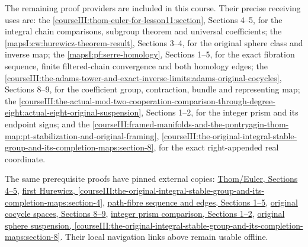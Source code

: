 The remaining proof providers are included in this course. Their precise receiving uses are: the \cref{courseIII:thom-euler-for-lesson11:section}, Sections 4--5, for the integral chain comparisons, subgroup theorem and universal coefficients; the \cref{mapsI:cw:hurewicz-theorem-result}, Sections 3--4, for the original sphere class and inverse map; the \cref{mapsI:pf:serre-homology}, Sections 1--5, for the exact fibration sequence, finite filtered-chain convergence and both homology edges; the \cref{courseIII:the-adams-tower-and-exact-inverse-limits:adams-original-cocycles}, Sections 8--9, for the coefficient group, contraction, bundle and representing map; the \cref{courseIII:the-actual-mod-two-cooperation-comparison-through-degree-eight:actual-eight-original-suspension}, Sections 1--2, for the integer prism and its endpoint signs; and the \cref{courseIII:framed-manifolds-and-the-pontryagin-thom-map:pt-stabilization-and-original-framing}, \cref{courseIII:the-original-integral-stable-group-and-its-completion-maps:section-8}, for the exact right-appended real coordinate.

The same prerequisite proofs have pinned external copies: \href{https://github.com/KokunoYumeto/open-math-courses/blob/72ad56efaa6388f333c9b477ff86a2b5c5b2e326/docs/courses/CG-S6/src/thom-euler-for-lesson11.md}{Thom/Euler, Sections 4--5}, \href{https://github.com/KokunoYumeto/open-math-courses/blob/72ad56efaa6388f333c9b477ff86a2b5c5b2e326/docs/courses/CG-S6/src/cw-models-and-the-first-hurewicz-map.md\#hurewicz-theorem}{first Hurewicz, \cref{courseIII:the-original-integral-stable-group-and-its-completion-maps:section-4}}, \href{https://github.com/KokunoYumeto/open-math-courses/blob/72ad56efaa6388f333c9b477ff86a2b5c5b2e326/docs/courses/CG-S6/src/path-fibres-and-integral-homotopy-equivalences.md\#serre-homology}{path-fibre sequence and edges, Sections 1--5}, \href{https://github.com/KokunoYumeto/open-math-courses/blob/72ad56efaa6388f333c9b477ff86a2b5c5b2e326/docs/courses/CG-S6/src/the-adams-tower-and-exact-inverse-limits.md\#adams-original-cocycles}{original cocycle spaces, Sections 8--9}, \href{https://github.com/KokunoYumeto/open-math-courses/blob/72ad56efaa6388f333c9b477ff86a2b5c5b2e326/docs/courses/CG-S6/src/the-actual-mod-two-cooperation-comparison-through-degree-eight.md\#actual-eight-original-suspension}{integer prism comparison, Sections 1--2}, \href{https://github.com/KokunoYumeto/open-math-courses/blob/72ad56efaa6388f333c9b477ff86a2b5c5b2e326/docs/courses/CG-S6/src/framed-manifolds-and-the-pontryagin-thom-map.md\#pt-stabilization-and-original-framing}{original sphere suspension, \cref{courseIII:the-original-integral-stable-group-and-its-completion-maps:section-8}}. Their local navigation links above remain usable offline.

